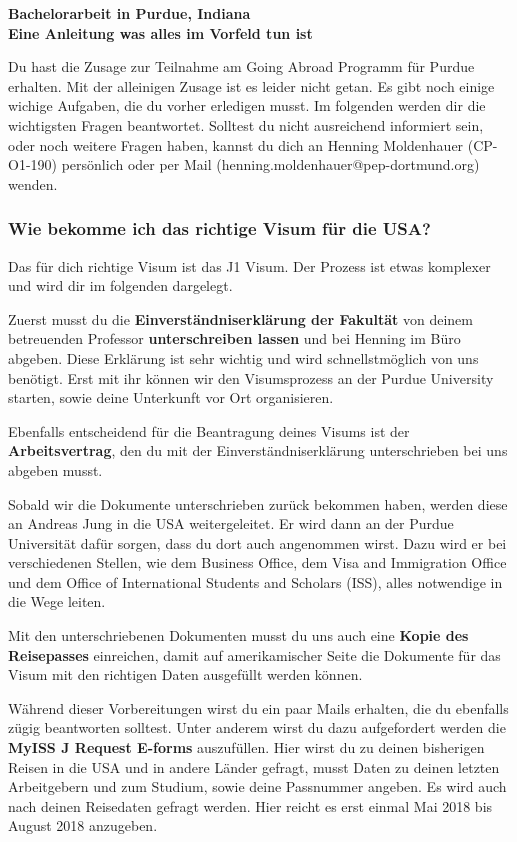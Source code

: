 \documentclass[
  paper=a4,
  fontsize=12pt,
  DIV=16,
  headheight=52pt,
  footheight=45pt,
  headinclude,
  parskip=full,
]{scrartcl}
\date{10. October 2017}
\begin{document}
\textbf{\Huge\sffamily Bachelorarbeit in Purdue, Indiana}\\[0.5\baselineskip]
\textbf{\Large\sffamily Eine Anleitung was alles im Vorfeld tun ist}

Du hast die Zusage zur Teilnahme am Going Abroad Programm für Purdue erhalten.
Mit der alleinigen Zusage ist es leider nicht getan.
Es gibt noch einige wichige Aufgaben, die du vorher erledigen musst.
Im folgenden werden dir die wichtigsten Fragen beantwortet.
Solltest du nicht ausreichend informiert sein, oder noch weitere Fragen haben,
kannst du dich an Henning Moldenhauer (CP-O1-190) persönlich oder per Mail
(henning.moldenhauer@pep-dortmund.org) wenden.

\subsubsection*{Wie bekomme ich das richtige Visum für die USA?}
Das für dich richtige Visum ist das J1 Visum.
Der Prozess ist etwas komplexer und wird dir im folgenden dargelegt.

Zuerst musst du die \textbf{Einverständniserklärung der Fakultät} von deinem
betreuenden Professor \textbf{unterschreiben lassen} und bei Henning im Büro
abgeben.
Diese Erklärung ist sehr wichtig und wird schnellstmöglich von uns benötigt.
Erst mit ihr können wir den Visumsprozess an der Purdue University starten, sowie
deine Unterkunft vor Ort organisieren.

Ebenfalls entscheidend für die Beantragung deines Visums ist der
\textbf{Arbeitsvertrag}, den du mit der Einverständniserklärung unterschrieben
bei uns abgeben musst.

Sobald wir die Dokumente unterschrieben zurück bekommen haben, werden diese an
Andreas Jung in die USA weitergeleitet.
Er wird dann an der Purdue Universität dafür sorgen, dass du dort auch angenommen
wirst. Dazu wird er bei verschiedenen Stellen, wie dem Business Office,
dem Visa and Immigration Office und dem Office of International Students and
Scholars (ISS), alles notwendige in die Wege leiten.

Mit den unterschriebenen Dokumenten musst du uns auch eine
\textbf{Kopie des Reisepasses} einreichen, damit auf amerikamischer Seite die
Dokumente für das Visum mit den richtigen Daten ausgefüllt werden können.

Während dieser Vorbereitungen wirst du ein paar Mails erhalten, die du
ebenfalls zügig beantworten solltest.
Unter anderem wirst du dazu aufgefordert werden die
\textbf{MyISS J Request E-forms} auszufüllen.
Hier wirst du zu deinen bisherigen Reisen in die USA und in andere Länder
gefragt, musst Daten zu deinen letzten Arbeitgebern und zum Studium, sowie
deine Passnummer angeben.
Es wird auch nach deinen Reisedaten gefragt werden. Hier reicht es erst einmal
Mai 2018 bis August 2018 anzugeben.
\end{document}
